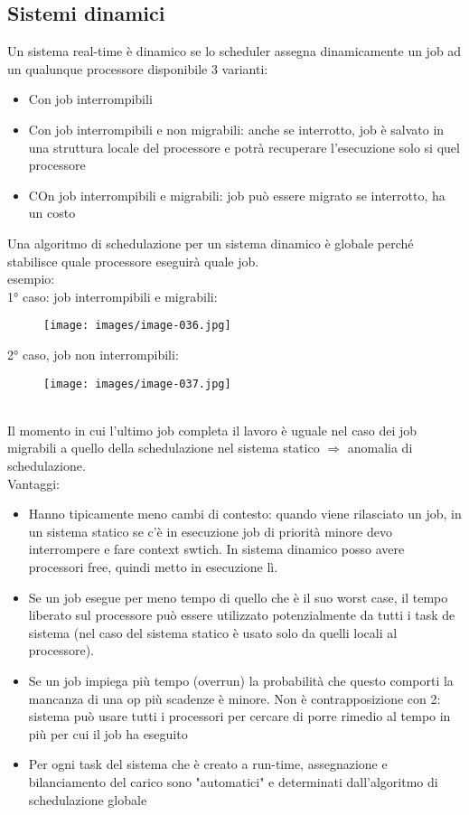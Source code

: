 \documentclass[12pt, oneside]{extbook}
\begin{document}
\subsection{Sistemi dinamici}
Un sistema real-time è dinamico se lo scheduler assegna dinamicamente un job ad un qualunque processore disponibile
3 varianti:
\begin{itemize}
\item Con job interrompibili
\item Con job interrompibili e non migrabili: anche se interrotto, job è salvato in una struttura locale del processore e potrà recuperare l'esecuzione solo si quel processore
\item COn job interrompibili e migrabili: job può essere migrato se interrotto, ha un costo
\end{itemize}
Una algoritmo di schedulazione per un sistema dinamico è globale perché stabilisce quale processore eseguirà quale job. \\esempio:\\
1° caso: job interrompibili e migrabili:\\
\begin{figure}[!h]
\centering
\texttt{[image: images/image-036.jpg]}
\end{figure}
2° caso, job non interrompibili:
\begin{figure}[!h]
\centering
\texttt{[image: images/image-037.jpg]}
\end{figure}
\\Il momento in cui l'ultimo job completa il lavoro è uguale nel caso dei job migrabili a quello della schedulazione nel sistema statico $\Rightarrow$ anomalia di schedulazione.\\ Vantaggi:
\begin{itemize}
\item Hanno tipicamente meno cambi di contesto: quando viene rilasciato un job, in un sistema statico se c'è in esecuzione job di priorità minore devo interrompere e fare context swtich. In sistema dinamico posso avere processori free, quindi metto in esecuzione lì.
\item Se un job esegue per meno tempo di quello che è il suo worst case, il tempo liberato sul processore può essere utilizzato potenzialmente da tutti i task de sistema (nel caso del sistema statico è usato solo da quelli locali al processore).
\item Se un job impiega più tempo (overrun) la probabilità che questo comporti la mancanza di una op più scadenze è minore. Non è contrapposizione con 2: sistema può usare tutti i processori per cercare di porre rimedio al tempo in più per cui il job ha eseguito
\item Per ogni task del sistema che è creato a run-time, assegnazione e bilanciamento del carico sono "automatici" e determinati dall'algoritmo di schedulazione globale
\end{itemize}
\end{document}
